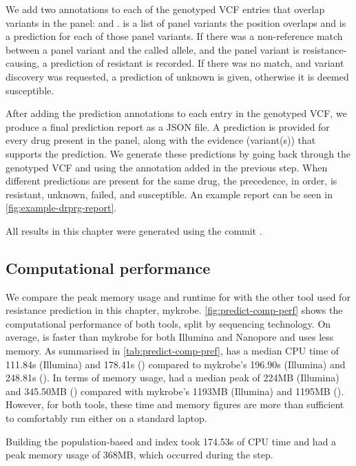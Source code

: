 We add two annotations to each of the genotyped VCF entries that overlap variants in the panel:  and .  is a list of panel variants the position overlaps and  is a prediction for each of those panel variants. If there was a non-reference match between a panel variant and the called allele, and the panel variant is resistance-causing, a prediction of resistant is recorded. If there was no match, and variant discovery was requested, a prediction of unknown is given, otherwise it is deemed susceptible. 

After adding the prediction annotations to each entry in the genotyped VCF, we produce a final prediction report as a JSON file. A prediction is provided for every drug present in the panel, along with the evidence (variant(s)) that supports the prediction. We generate these predictions by going back through the genotyped VCF and using the  annotation added in the previous step. When different predictions are present for the same drug, the precedence, in order, is resistant, unknown, failed, and susceptible. An example report can be seen in \autoref{fig:example-drprg-report}.

\noindent
All \drprg{} results in this chapter were generated using the commit \href{https://github.com/mbhall88/drprg/tree/cb4f9b82b5d03de45b8016ae5d54bbce7a8f3a0f}{}.

\subsection{Computational performance}
\label{sec:drprg-comp-perf}

We compare the peak memory usage and runtime for \drprg{}  with the other tool used for resistance prediction in this chapter, mykrobe. \autoref{fig:predict-comp-perf} shows the computational performance of both tools, split by sequencing technology. On average, \drprg{} is faster than mykrobe for both Illumina and Nanopore and uses less memory. As summarised in \autoref{tab:predict-comp-pref}, \drprg{} has a median CPU time of 111.84s (Illumina) and 178.41s (\ont{}) compared to mykrobe's 196.90s (Illumina) and 248.81s (\ont{}). In terms of memory usage, \drprg{} had a median peak of 224MB (Illumina) and 345.50MB (\ont{}) compared with mykrobe's 1193MB (Illumina) and 1195MB (\ont{}). However, for both tools, these time and memory figures are more than sufficient to comfortably run either on a standard laptop. 

Building the \drprg{} population-based \prg{} and index took 174.53s of CPU time and had a peak memory usage of 368MB, which occurred during the \makeprg{} step.

